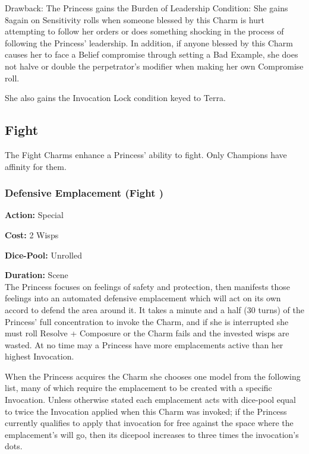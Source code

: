\noindent Drawback: The Princess gains the Burden of Leadership Condition: She gains 8again on Sensitivity rolls when someone blessed by this Charm is hurt attempting to follow her orders or does something shocking in the process of following the Princess' leadership. In addition, if anyone blessed by this Charm causes her to face a Belief compromise through setting a Bad Example, she does not halve or double the perpetrator's modifier when making her own Compromise roll.

She also gains the Invocation Lock condition keyed to Terra. 

\subsection*{Fight}
\label{subsec:Fight}
The Fight Charms enhance a Princess' ability to fight. Only Champions have affinity for them.

\subsubsection*{Defensive Emplacement (Fight \textbullet)}

\noindent \textbf{Action:} Special

\noindent \textbf{Cost:} 2 Wisps

\noindent \textbf{Dice-Pool:} Unrolled

\noindent \textbf{Duration:} Scene\\

The Princess focuses on feelings of safety and protection, then manifests those feelings into an automated defensive emplacement which will act on its own accord to defend the area around it. It takes a minute and a half (30 turns) of the Princess' full concentration to invoke the Charm, and if she is interrupted she must roll Resolve + Composure or the Charm fails and the invested wisps are wasted. At no time may a Princess have more emplacements active than her highest Invocation.

When the Princess acquires the Charm she chooses one model from the following list, many of which require the emplacement to be created with a specific Invocation. Unless otherwise stated each emplacement acts with dice-pool equal to twice the Invocation applied when this Charm was invoked; if the Princess currently qualifies to apply that invocation for free against the space where the emplacement's will go, then its dicepool increases to three times the invocation's dots. 

